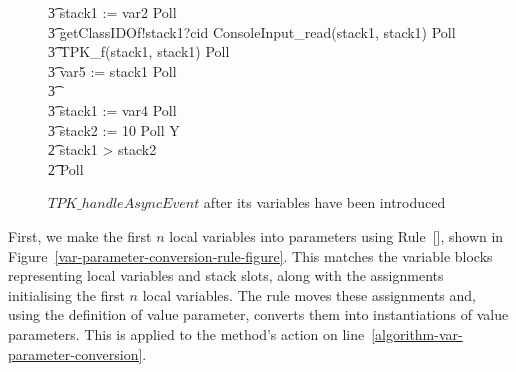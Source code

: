 \begin{figure}[tbp!]
\begin{circusaction}
    \t3 stack1 := var2 \circseq Poll \circseq \\
    \t3 getClassIDOf!stack1?cid \then ConsoleInput\_read(stack1, stack1) \circseq Poll \circseq \\
    \t3 TPK\_f(stack1, stack1) \circseq Poll \circseq \\
    \t3 var5 := stack1 \circseq Poll \circseq \\
    \t3 {} \cdots {} \\
    \t3 stack1 := var4 \circseq Poll \circseq \\
    \t3 stack2 := 10 \circseq Poll \circseq Y \\
    \t2 {} \circelse stack1 > stack2 \circthen \Skip \\
    \t2 \circfi \circseq Poll
  \end{circusaction}
  \caption{$TPK\_handleAsyncEvent$ after its variables have been introduced}
  \label{efs-introduce-variables-mid-example-figure}
\end{figure}

First, we make the first $n$ local variables into parameters using
Rule~[], shown in
Figure~\ref{var-parameter-conversion-rule-figure}.
This matches the \Circus{} variable blocks representing local
variables and stack slots, along with the assignments initialising the
first $n$ local variables.
The rule moves these assignments and, using the definition of value
parameter, converts them into instantiations of value parameters.
This is applied to the method's action on
line~\ref{algorithm-var-parameter-conversion}.


